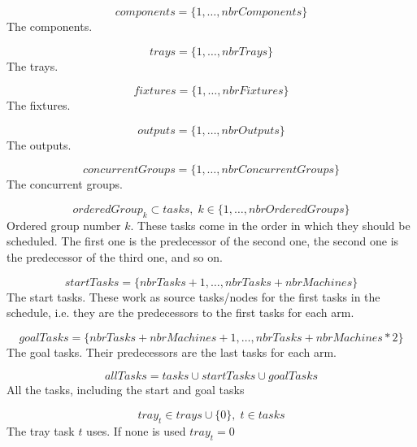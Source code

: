 \documentclass[10pt,a4paper]{report}
\begin{document}
\begin{equation}\label{eq:13}
components = \{1 , \ldots , nbrComponents\}\end{equation}
The components.

\begin{equation}\label{eq:14}
trays = \{1 , \ldots , nbrTrays\}\end{equation}
The trays.

\begin{equation}\label{eq:15}
fixtures = \{1 , \ldots , nbrFixtures\}\end{equation}
The fixtures.

\begin{equation}\label{eq:16}
outputs = \{1 , \ldots , nbrOutputs\}\end{equation}
The outputs.

\begin{equation}\label{eq:17}
concurrentGroups = \{1 , \ldots , nbrConcurrentGroups\}\end{equation}
The concurrent groups.

\begin{equation}\label{eq:18}
orderedGroup_k \subset tasks, \; k \in \{1 , \ldots , nbrOrderedGroups\}\end{equation}
Ordered group number $k$. These tasks come in the order in which they should be scheduled. The first one is the predecessor of the second one, the second one is the predecessor of the third one, and so on.

\begin{equation}\label{eq:19}
startTasks = \{nbrTasks+1 , \ldots , nbrTasks+nbrMachines\}\end{equation}
The start tasks. These work as source tasks/nodes for the first tasks in the schedule, i.e. they are the predecessors to the first tasks for each arm.

\begin{equation}\label{eq:20}
goalTasks = \{nbrTasks+nbrMachines+1 , \ldots , nbrTasks+nbrMachines*2\}\end{equation}
The goal tasks. Their predecessors are the last tasks for each arm.

\begin{equation}\label{eq:21}
allTasks = tasks \cup startTasks \cup goalTasks\end{equation}
All the tasks, including the start and goal tasks

\begin{equation}\label{eq:22}
tray_t \in trays \cup \{0\}, \; t \in tasks\end{equation}
The tray task $t$ uses. If none is used $tray_t = 0$
\end{document}
